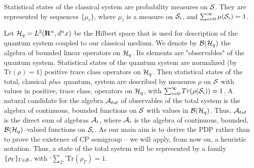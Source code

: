 \documentclass[12pt]{article}
\def\tr{\mbox{Tr}}
\begin{document}
Statistical states of the classical system are probability measures on
${\cal S}$. They are represented by sequences $\{ \mu_i \}$, where $ \mu_i$
is a measure on ${\cal S}_i$, and $\sum_{i=0}^{\infty }\mu ({\cal S}_i) =1$.

Let ${\cal H}_q= {\sl L}^2({\bf R}^n,d^n x)$ be the Hilbert space that is
used for description of the quantum system coupled to our classical medium.
We denote by ${\cal B} ({\cal H}_q )$ the algebra of bounded linear
operators on ${\cal H}_q$. Its elements are "observables" of the quantum
system. Statistical states of the quantum system are normalized (by $\tr
(\rho )=1$) positive trace class operators on ${\cal H}_q$. Then
statistical states of the total, classical {\sl plus}\, quantum, system are
described by measures $\rho $ on ${\cal S}$ with values in positive, trace
class, operators on ${\cal H}_q$, with $\sum_{i=0}^{\infty }Tr ( \rho
({\cal S}_i )) =1$. A natural candidate for the algebra ${\cal A}_{tot}$ of
observables of the total system is the algebra of continuous, bounded
functions on ${\cal S}$ with values in ${\cal B} ({\cal H}_q )$. Thus,
${\cal A}_{tot}$ is the direct sum of algebras ${\cal A}_i$, where ${\cal
A}_i$ is the algebra of continuous, bounded, ${\cal B} ({\cal
H}_q)$--valued functions on ${\cal S}_i$. As our main aim is to derive the
PDP rather than to prove the existence of CP semigroup -- we will apply,
from now on, a heuristic notation. Thus, a state of the total system will
be represented by a family $\{ \rho_\Gamma \}_{\Gamma\in {\cal S}}$, with
\lq$\sum_\Gamma$\rq $\tr(\rho_\Gamma)=1$.
\end{document}
